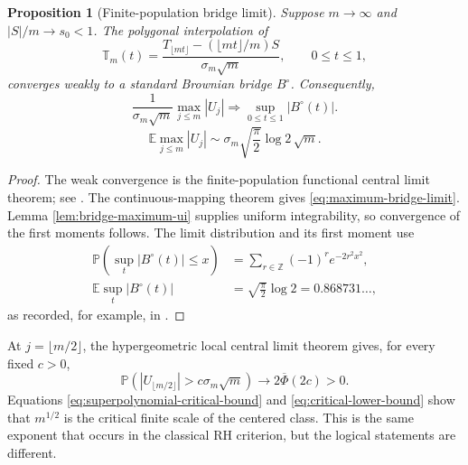 \documentclass[11pt,reqno]{amsart}
\numberwithin{equation}{section}
\theoremstyle{plain}
\newtheorem{proposition}[theorem]{Proposition}
\theoremstyle{definition}
\theoremstyle{remark}
\newcommand{\E}{\mathbb E}
\newcommand{\Prob}{\mathbb P}
\begin{document}
\begin{proposition}[Finite-population bridge limit]
\label{prop:finite-population-fclt}
Suppose \(m\to\infty\) and \(|S|/m\to s_0<1\).  The polygonal interpolation
of
\begin{equation}
\mathbb T_m(t)=\frac{T_{\lfloor mt\rfloor}
-(\lfloor mt\rfloor/m)S}{\sigma_m\sqrt m},
\qquad 0\leq t\leq1,
\label{eq:bridge-process-normalization}
\end{equation}
converges weakly to a standard Brownian bridge \(B^{\circ}\).  Consequently,
\begin{equation}
\frac{1}{\sigma_m\sqrt m}\max_{j\leq m}|U_j|
\Longrightarrow\sup_{0\leq t\leq1}|B^{\circ}(t)|.
\label{eq:maximum-bridge-limit}
\end{equation}
\begin{equation}
\E\max_{j\leq m}|U_j|
\sim\sigma_m\sqrt{\frac{\pi}{2}}\log2\,\sqrt m.
\label{eq:expected-bridge-maximum}
\end{equation}
\end{proposition}

\begin{proof}
The weak convergence is the finite-population functional central limit
theorem; see \cite{Sen1972}.  The continuous-mapping theorem gives
\eqref{eq:maximum-bridge-limit}.  Lemma \ref{lem:bridge-maximum-ui} supplies
uniform integrability, so convergence of the first moments follows.  The
limit distribution and its first moment use
\begin{align}
\Prob\left(\sup_t|B^{\circ}(t)|\leq x\right)
&=\sum_{r\in\mathbb Z}(-1)^r e^{-2r^2x^2},
\label{eq:kolmogorov-distribution}\\
\E\sup_t|B^{\circ}(t)|
&=\sqrt{\frac{\pi}{2}}\log2
=0.868731\ldots,
\label{eq:kolmogorov-mean}
\end{align}
as recorded, for example, in \cite{Feller1968}.
\end{proof}

At \(j=\lfloor m/2\rfloor\), the hypergeometric local central limit theorem
gives, for every fixed \(c>0\),
\begin{equation}
\Prob\left(|U_{\lfloor m/2\rfloor}|>c\sigma_m\sqrt m\right)
\longrightarrow2\overline\Phi(2c)>0.
\label{eq:critical-lower-bound}
\end{equation}
Equations \eqref{eq:superpolynomial-critical-bound} and
\eqref{eq:critical-lower-bound} show that \(m^{1/2}\) is the critical finite
scale of the centered class.  This is the same exponent that occurs in the
classical RH criterion, but the logical statements are different.
\end{document}
